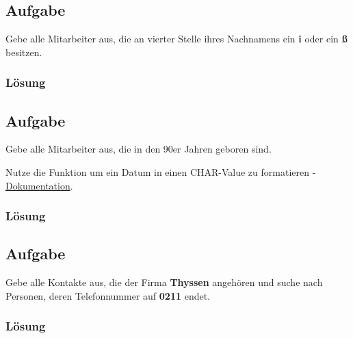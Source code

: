 \subsection{Aufgabe}
\label{sec:uebung_01.aufgabe_05}
Gebe alle Mitarbeiter aus, die an vierter Stelle ihres Nachnamens ein \textbf{i} oder ein \textbf{ß} besitzen.

\subsubsection*{Lösung}
\label{sec:uebung_01.aufgabe_05.loesung}

\subsection{Aufgabe}
\label{sec:uebung_01.aufgabe_06}
Gebe alle Mitarbeiter aus, die in den 90er Jahren geboren sind.

\begin{info-popup}
  Nutze die Funktion  um ein Datum in einen CHAR-Value zu formatieren - \href{https://docs.oracle.com/cd/B19306_01/server.102/b14200/functions180.htm}{Dokumentation}.

  \end{info-popup}

\subsubsection*{Lösung}
\label{sec:uebung_01.aufgabe_06.loesung}

\subsection{Aufgabe}
\label{sec:uebung_01.aufgabe_07}
Gebe alle Kontakte aus, die der Firma \textbf{Thyssen} angehören und suche nach Personen, deren Telefonnummer auf \textbf{0211} endet.

\subsubsection*{Lösung}
\label{sec:uebung_01.aufgabe_07.loesung}

